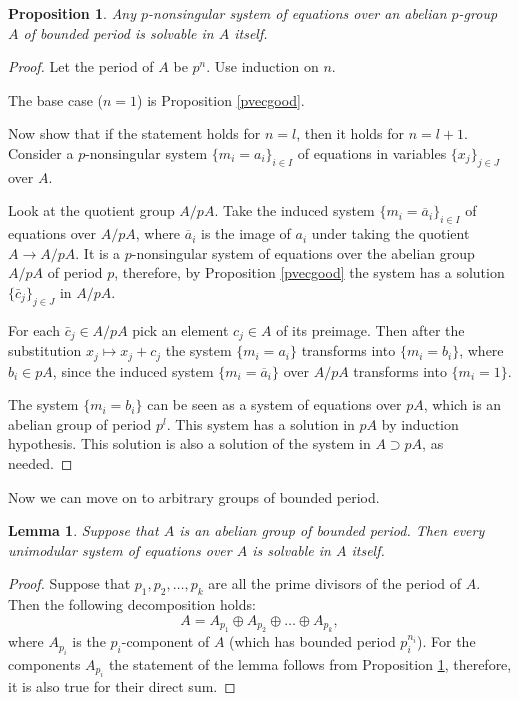 \documentclass{article}
\newtheorem{lemma}{Lemma}
\newtheorem{prop}{Proposition}
\theoremstyle{definition}
\theoremstyle{remark}
\begin{document}
\begin{prop}\label{pgood}
Any $p$-nonsingular system of equations
over an abelian $p$-group $A$ of bounded period
is solvable in $A$ itself.
\end{prop}
\begin{proof}
Let the period of $A$ be $p^n$.
Use induction on $n$.

The base case ($n=1$) is Proposition \ref{pvecgood}.

Now show that if the statement holds
for $n=l$, then it holds for $n=l+1$.
Consider a $p$-nonsingular system
$\{m_i = a_i\}_{i \in I}$ of equations in variables
$\{x_j\}_{j \in J}$ over $A$.

Look at the quotient group $A/pA$.
Take the induced system $\{m_i=\overline{a}_i\}_{i\in I}$
of equations over $A/pA$, where $\overline{a}_i$ is the image of $a_i$
under taking the quotient $A \to A/pA$.
It is a $p$-nonsingular system of equations over the abelian group $A/pA$
of period $p$, therefore, by Proposition \ref{pvecgood}
the system has a solution $\{\bar c_j\}_{j\in J}$ in $A/pA$.

For each $\bar c_j \in A/pA$ pick an element
$c_j \in A$ of its preimage.
Then after the substitution
$x_j \mapsto x_j+c_j$ the system
$\{m_i = a_i\}$ transforms into
$\{m_i = b_i\}$, where $b_i \in pA$,
since the induced system $\{m_i=\overline{a}_i\}$
over $A/pA$
transforms into
$\{m_i=1\}$.

The system $\{m_i = b_i\}$ can be seen as a system of equations over
$pA$, which is an abelian group of period $p^l$.
This system has a solution in $pA$ by induction hypothesis.
This solution is also a solution of the system in $A \supset pA$,
as needed.
\end{proof}

Now we can move on to arbitrary groups of bounded period.

\begin{lemma}\label{good}
Suppose that $A$ is an abelian group of bounded period.
Then every unimodular system of equations over $A$
is solvable in $A$ itself.
\end{lemma}
\begin{proof}
Suppose that $p_1, p_2,\ldots, p_k$
are all the prime divisors of the period of $A$.
Then the following decomposition holds:
$$
A = A_{p_1}
\oplus A_{p_2} \oplus \ldots \oplus A_{p_k},
$$
where $A_{p_i}$ is the $p_i$-component of $A$
(which has bounded period $p_i^{n_i}$).
For the components $A_{p_i}$
the statement of the lemma follows
from Proposition \ref{pgood},
therefore, it is also true for their direct sum.
\end{proof}
\end{document}

